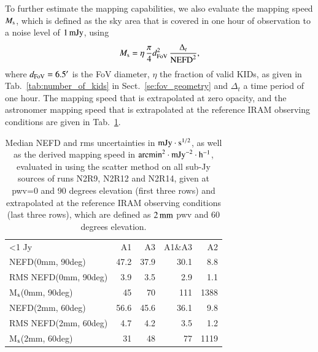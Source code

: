 To further estimate the mapping capabilities, we also evaluate the
mapping speed $M_{\rm{s}}$, which is defined as the sky area that is covered in one
hour of observation to a noise level of $1\,\rm{mJy}$, using
\begin{equation}
M_{\rm{s}} = \eta \, \frac{\pi}{4} d_{\rm{FoV}}^2 \, \frac{\Delta_t}{\rm{NEFD}^2},
\end{equation}
where $d_{\rm{FoV}} = 6.5'$ is the FoV diameter, $\eta$ the
fraction of valid KIDs, as given in Tab.~\ref{tab:number_of_kids} in
Sect.~\ref{se:fov_geometry} and $\Delta_t$ a time period of one hour.
The mapping speed that is extrapolated at zero opacity, and the astronomer
mapping speed that is extrapolated at the reference IRAM observing conditions are
given in Tab.~\ref{tab:nefd_astro}.   

\begin{table}[!thbp]
  \begin{center}
    \caption[NEFD estimates on all sub-Jy sources]{Median NEFD and rms
      uncertainties in $\rm{mJy}\cdot \rm{s}^{1/2}$, as well as the derived mapping
      speed in $\rm{arcmin}^2\cdot\rm{mJy}^{-2}\cdot\rm{h}^{-1}$, evaluated
      in using the scatter method on all sub-Jy sources of runs N2R9, N2R12
      and N2R14, given at pwv=0 and 90 degrees elevation (first three rows) and extrapolated at the
      reference IRAM observing conditions (last three rows), which are defined
      as $2\,\rm{mm}$ pwv and 60 degrees elevation.}
    \label{tab:nefd_astro}
    \begin{tabular}{lrrrr}
      \hline\hline
      \noalign{\smallskip}
      <1 Jy               & A1      &   A3    &   A1\&A3 &    A2 \\
      \noalign{\smallskip}
      \hline
      \noalign{\smallskip}
      NEFD\small{(0mm, 90deg)}             & 47.2    & 37.9    &    30.1  &    8.8   \\
      RMS NEFD\small{(0mm, 90deg)}         &  3.9    &  3.5    &     2.9  &    1.1   \\
      M$_{\rm{s}}$\small{(0mm, 90deg)}      & 45      &  70     &    111   &   1388   \\
      \hline
      \noalign{\smallskip}
      NEFD\small{(2mm, 60deg)}         & 56.6    & 45.6    &    36.1  &    9.8   \\
      RMS NEFD\small{(2mm, 60deg)}     &  4.7    & 4.2     &     3.5  &    1.2   \\
      M$_{\rm{s}}$\small{(2mm, 60deg)}  &  31    & 48       &    77   &   1119   \\
      \hline
    \end{tabular}
\end{center}
\end{table}
